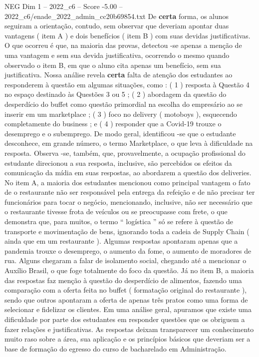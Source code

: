 \begin{textsample}{NEG Dim 1 – 2022\_c6 – Score -5.00 – 2022\_c6/enade\_2022\_admin\_cc20b69854.txt}
De \textbf{certa} forma, os alunos seguiram a orientação, contudo, sem observar que deveriam apontar duas vantagens ( item A ) e dois benefícios ( item B ) com suas devidas justificativas.
O que ocorreu é que, na maioria das provas, detectou -se apenas a menção de uma vantagem e sem sua devida justificativa, ocorrendo o mesmo quando observado o item B, em que o aluno cita apenas um benefício, sem sua justificativa.
Nossa análise revela \textbf{certa} falta de atenção dos estudantes ao responderem à questão em algumas situações, como : ( 1 ) resposta à Questão 4 no espaço destinado às Questões 3 ou 5 ; ( 2 ) abordagem da questão do desperdício do buffet como questão primordial na escolha do empresário ao se inserir em um marketplace ; ( 3 ) foco no delivery ( motoboys ), esquecendo completamente do business ; e ( 4 ) responder que a Covid-19 trouxe o desemprego e o subemprego.
De modo geral, identificou -se que o estudante desconhece, em grande número, o termo Marketplace, o que leva à dificuldade na resposta.
Observa -se, também, que, provavelmente, a ocupação profissional do estudante direcionou a sua resposta, inclusive, são percebidos os efeitos da comunicação da mídia em suas respostas, ao abordarem a questão dos deliveries.
No item A, a maioria dos estudantes mencionou como principal vantagem o fato de o restaurante não ser responsável pela entrega da refeição e de não precisar ter funcionários para tocar o negócio, mencionando, inclusive, não ser necessário que o restaurante tivesse frota de veículos ou se preocupasse com frete, o que demonstra que, para muitos, o termo “ logística ” só se refere à questão de transporte e movimentação de bens, ignorando toda a cadeia de Supply Chain ( ainda que em um restaurante ).
Algumas respostas apontaram apenas que a pandemia trouxe o desemprego, o aumento da fome, o aumento de moradores de rua.
Alguns chegaram a falar de isolamento social, chegando até a mencionar o Auxílio Brasil, o que foge totalmente do foco da questão.
Já no item B, a maioria das respostas faz menção à questão do desperdício de alimentos, fazendo uma comparação com a oferta feita no buffet ( formatação original do restaurante ), sendo que outros apontaram a oferta de apenas três pratos como uma forma de selecionar e fidelizar os clientes.
Em uma análise geral, apuramos que existe uma dificuldade por parte dos estudantes em responder questões que os obriguem a fazer relações e justificativas.
As respostas deixam transparecer um conhecimento muito raso sobre a área, sua aplicação e os princípios básicos que deveriam ser a base de formação do egresso do curso de bacharelado em Administração.

\end{textsample}
